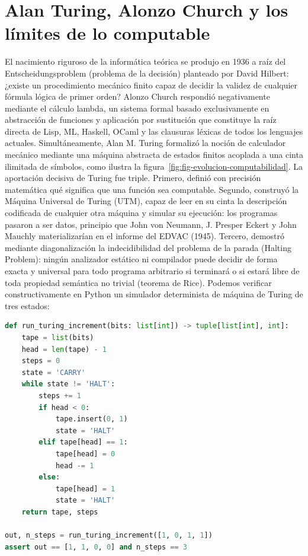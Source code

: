 \documentclass{book}
\begin{document}
\section{Alan Turing, Alonzo Church y los límites de lo computable}

El nacimiento riguroso de la informática teórica se produjo en 1936 a raíz del Entscheidungsproblem (problema de la decisión) planteado por David Hilbert: ¿existe un procedimiento mecánico finito capaz de decidir la validez de cualquier fórmula lógica de primer orden? Alonzo Church respondió negativamente mediante el cálculo lambda, un sistema formal basado exclusivamente en abstracción de funciones y aplicación por sustitución que constituye la raíz directa de Lisp, ML, Haskell, OCaml y las clausuras léxicas de todos los lenguajes actuales. Simultáneamente, Alan M. Turing formalizó la noción de calculador mecánico mediante una máquina abstracta de estados finitos acoplada a una cinta ilimitada de símbolos, como ilustra la figura~\ref{fig:fig-evolucion-computabilidad}.
La aportación decisiva de Turing fue triple. Primero, definió con precisión matemática qué significa que una función sea computable. Segundo, construyó la Máquina Universal de Turing (UTM), capaz de leer en su cinta la descripción codificada de cualquier otra máquina y simular su ejecución: los programas pasaron a ser datos, principio que John von Neumann, J. Presper Eckert y John Mauchly materializarían en el informe del EDVAC (1945). Tercero, demostró mediante diagonalización la indecidibilidad del problema de la parada (Halting Problem): ningún analizador estático ni compilador puede decidir de forma exacta y universal para todo programa arbitrario si terminará o si estará libre de toda propiedad semántica no trivial (teorema de Rice). Podemos verificar constructivamente en Python un simulador determinista de máquina de Turing de tres estados:
\begin{lstlisting}[style=studium,language={Python}]
def run_turing_increment(bits: list[int]) -> tuple[list[int], int]:
    tape = list(bits)
    head = len(tape) - 1
    steps = 0
    state = 'CARRY'
    while state != 'HALT':
        steps += 1
        if head < 0:
            tape.insert(0, 1)
            state = 'HALT'
        elif tape[head] == 1:
            tape[head] = 0
            head -= 1
        else:
            tape[head] = 1
            state = 'HALT'
    return tape, steps

out, n_steps = run_turing_increment([1, 0, 1, 1])
assert out == [1, 1, 0, 0] and n_steps == 3
\end{lstlisting}
\end{document}
